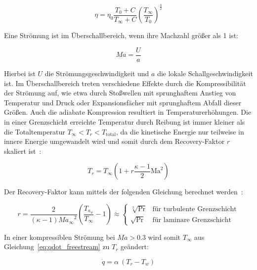 \begin{equation}
  \label{eq:dynamische_viskositaet}
  \eta = \eta_0 \frac{T_0 + C}{T_{\infty} + C} {\left( \frac{T_{\infty}}{T_0} \right)}^{\frac{3}{2}}
\end{equation}

Eine Strömung ist im Überschallbereich, wenn ihre Machzahl größer als 1 ist:

\begin{equation}
  \label{eq:machzahl}
  Ma = \frac{U}{a}
\end{equation}

Hierbei ist $U$ die Strömungsgeschwindigkeit und $a$ die lokale Schallgeschwindigkeit ist. Im Überschallbereich treten verschiedene
Effekte durch die Kompressibilität der Strömung auf, wie etwa durch Stoßwellen mit sprunghaftem Anstieg von Temperatur und Druck
oder Expansionsfächer mit sprunghaftem Abfall dieser Größen. Auch die adiabate Kompression resultiert in Temperaturerhöhungen.
Die in einer Grenzschicht erreichte Temperatur durch Reibung
ist immer kleiner als die Totaltemperatur \mbox{$T_{\infty} < T_r < T_\mathrm{total}$}, da die kinetische Energie nur teilweise in innere Energie
umgewandelt wird und somit durch dem Recovery-Faktor $r$ skaliert ist~\cite{Anderson-2017}:

\begin{equation}
  \label{eq:recovery_temperatur}
  T_r = T_{\infty} \left( 1 + r \frac{\kappa - 1}{2} \text{Ma}^2 \right)
\end{equation}

Der Recovery-Faktor kann mittels der folgenden Gleichung berechnet werden~\cite{Anderson-2017}:

\begin{equation}
  \label{eq:recovery_faktor}
  r = \frac{2}{\left( \kappa - 1 \right) {Ma_{\infty}}^2} \left( \frac{T_{a_{w}}}{T_{\infty}} - 1 \right) \approx
  \begin{cases}
    \sqrt[3]{\text{Pr}} & \text{für turbulente Grenzschicht}\\
    \sqrt{\text{Pr}} & \text{für laminare Grenzschicht}
  \end{cases}
\end{equation}

In einer kompressiblen Strömung bei $Ma > 0.3$ wird somit $T_{\infty}$ aus Gleichung~\ref{eq:qdot_freestream} zu $T_r$ geändert:

\begin{equation}
  \label{eq:qdot_recovery}
  \dot{q} = \alpha \ (T_r - T_w)
\end{equation}

